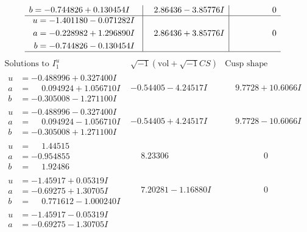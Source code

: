 \documentclass[1p]{elsarticle_modified}
\theoremstyle{definition}
\newcommand{\I}{\sqrt{-1}}
\begin{document}
$$\begin{array}{c|c|c}
\begin{aligned}
b &= -0.744826 + 0.130454 I\end{aligned}
 & \phantom{-}2.86436 - 3.85776 I & \phantom{-0.000000 } 0 \\ \hline\begin{aligned}
u &= -1.401180 - 0.071282 I \\
a &= -0.228982 + 1.296890 I \\
b &= -0.744826 - 0.130454 I\end{aligned}
 & \phantom{-}2.86436 + 3.85776 I & \phantom{-0.000000 } 0\\
 \hline 
 \end{array}$$\newpage$$\begin{array}{c|c|c}  
\text{Solutions to }I^u_{1}& \I (\text{vol} + \sqrt{-1}CS) & \text{Cusp shape}\\
 \hline 
\begin{aligned}
u &= -0.488996 + 0.327400 I \\
a &= \phantom{-}0.094924 + 1.056710 I \\
b &= -0.305008 - 1.271100 I\end{aligned}
 & -0.54405 - 4.24517 I & \phantom{-}9.7728 + 10.6066 I \\ \hline\begin{aligned}
u &= -0.488996 - 0.327400 I \\
a &= \phantom{-}0.094924 - 1.056710 I \\
b &= -0.305008 + 1.271100 I\end{aligned}
 & -0.54405 + 4.24517 I & \phantom{-}9.7728 - 10.6066 I \\ \hline\begin{aligned}
u &= \phantom{-}1.44515\phantom{ +0.000000I} \\
a &= -0.954855\phantom{ +0.000000I} \\
b &= \phantom{-}1.92486\phantom{ +0.000000I}\end{aligned}
 & \phantom{-}8.23306\phantom{ +0.000000I} & \phantom{-0.000000 } 0 \\ \hline\begin{aligned}
u &= -1.45917 + 0.05319 I \\
a &= -0.69275 + 1.30705 I \\
b &= \phantom{-}0.771612 - 1.000240 I\end{aligned}
 & \phantom{-}7.20281 - 1.16880 I & \phantom{-0.000000 } 0 \\ \hline\begin{aligned}
u &= -1.45917 - 0.05319 I \\
a &= -0.69275 - 1.30705 I \\

\end{aligned}
\end{array}$$
\end{document}
